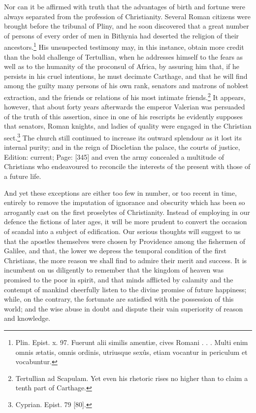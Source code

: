 Nor can it be affirmed with truth that the advantages of birth and fortune were always separated from the profession of Christianity. Several Roman citizens were brought before the tribunal of Pliny, and he soon discovered that a great number of persons of every order of men in Bithynia had deserted the religion of their ancestors.\footnote{Plin. Epist. x. 97. Fuerunt alii similis amentiæ, cives Romani . . . Multi enim omnis ætatis, omnis ordinis, utriusque sexûs, etiam vocantur in periculum et vocabuntur.} His unsuspected testimony may, in this instance, obtain more credit than the bold challenge of Tertullian, when he addresses himself to the fears as well as to the humanity of the proconsul of Africa, by assuring him that, if he persists in his cruel intentions, he must decimate Carthage, and that he will find among the guilty many persons of his own rank, senators and matrons of noblest extraction, and the friends or relations of his most intimate friends.\footnote{Tertullian ad Scapulam. Yet even his rhetoric rises no higher than to claim a tenth part of Carthage.} It appears, however, that about forty years afterwards the emperor Valerian was persuaded of the truth of this assertion, since in one of his rescripts he evidently supposes that senators, Roman knights, and ladies of quality were engaged in the Christian sect.\footnote{Cyprian. Epist. 79 [80].} The church still continued to increase its outward splendour as it lost its internal purity; and in the reign of Diocletian the palace, the courts of justice, Edition: current; Page: [345] and even the army concealed a multitude of Christians who endeavoured to reconcile the interests of the present with those of a future life.

And yet these exceptions are either too few in number, or too recent in time, entirely to remove the imputation of ignorance and obscurity which has been so arrogantly cast on the first proselytes of Christianity. Instead of employing in our defence the fictions of later ages, it will be more prudent to convert the occasion of scandal into a subject of edification. Our serious thoughts will suggest to us that the apostles themselves were chosen by Providence among the fishermen of Galilee, and that, the lower we depress the temporal condition of the first Christians, the more reason we shall find to admire their merit and success. It is incumbent on us diligently to remember that the kingdom of heaven was promised to the poor in spirit, and that minds afflicted by calamity and the contempt of mankind cheerfully listen to the divine promise of future happiness; while, on the contrary, the fortunate are satisfied with the possession of this world; and the wise abuse in doubt and dispute their vain superiority of reason and knowledge.

